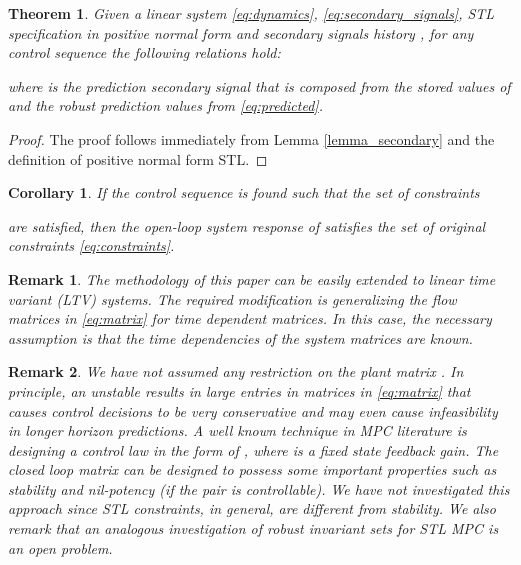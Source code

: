 \documentclass[letterpaper, 10 pt, conference]{ieeeconf}
\newtheorem{remark}{Remark}
\newtheorem{theorem}{Theorem}
\newtheorem{corollary}{Corollary}
\begin{document}
\begin{theorem}
\label{theorem_robust}
Given a linear system \eqref{eq:dynamics}, \eqref{eq:secondary_signals}, STL specification  in positive normal form and secondary signals history , for any control sequence  the following relations hold:

where  is the prediction secondary signal that is composed from the stored values of  and the robust prediction values from \eqref{eq:predicted}.
\end{theorem}
\begin{proof}
The proof follows immediately from Lemma \ref{lemma_secondary} and the definition of positive normal form STL. 
\end{proof}
\begin{corollary}
If the control sequence  is found such that the set of constraints

are satisfied, then the open-loop system response of  satisfies the set of original constraints \eqref{eq:constraints}. 
\end{corollary}


\begin{remark}
The methodology of this paper can be easily extended to linear time variant (LTV) systems. The required modification is generalizing the flow matrices in \eqref{eq:matrix} for time dependent matrices. In this case, the necessary assumption is that the time dependencies of the system matrices are known. 
\end{remark}

\begin{remark}
We have not assumed any restriction on the plant matrix . In principle, an unstable  results in large entries in matrices in \eqref{eq:matrix} that causes control decisions to be very conservative and may even cause infeasibility in longer horizon predictions. A well known technique in MPC literature is designing a control law in the form of , where  is a fixed state feedback gain. The closed loop matrix  can be designed to possess some important properties such as stability and nil-potency (if the pair  is controllable). We have not investigated this approach since STL constraints, in general, are different from stability. We also remark that an analogous investigation of robust invariant sets \cite{bemporad1999robust} for STL MPC is an open problem.
\end{remark}
\end{document}
